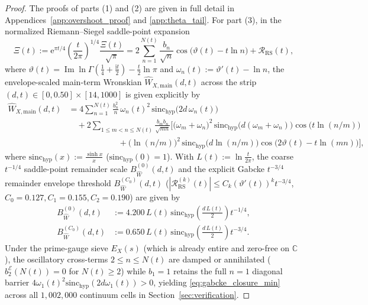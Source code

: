 \documentclass[11pt,reqno,a4paper]{amsart}
\theoremstyle{plain}
\theoremstyle{definition}
\theoremstyle{remark}
\numberwithin{equation}{section}
\newcommand{\ii}{\mathrm{i}}
\newcommand{\ee}{\mathrm{e}}
\begin{document}
\begin{proof}
The proofs of parts (1) and (2) are given in full detail in Appendices~\ref{app:overshoot_proof} and \ref{app:theta_tail}. For part (3), in the normalized Riemann--Siegel saddle-point expansion \cite{Gabcke1979,Olver1974}
\begin{equation}\label{eq:RS_normalized}
  \widehat{\Xi}(t) := \ee^{\pi t/4}\left(\frac{t}{2\pi}\right)^{1/4}\frac{\Xi(t)}{\sqrt{\pi}}
  = 2\sum_{n=1}^{N(t)}\frac{b_n}{\sqrt{n}}\cos\big(\vartheta(t) - t\ln n\big) + \mathcal{R}_{\mathrm{RS}}(t),
\end{equation}
where $\vartheta(t) = \operatorname{Im}\ln\Gamma(\frac{1}{4}+\frac{\ii t}{2}) - \frac{t}{2}\ln\pi$ and $\omega_n(t) := \vartheta'(t) - \ln n$, the envelope-scaled main-term Wronskian $\widehat{W}_{X,\mathrm{main}}(d,t)$ across the strip $(d,t) \in [0,0.50]\times[14,1000]$ is given explicitly by
\begin{equation}\label{eq:W_main_split}
\begin{aligned}
  \widehat{W}_{X,\mathrm{main}}(d,t)
  &= 4\sum_{n=1}^{N(t)}\frac{b_n^2}{n}\,\omega_n(t)^2\,\mathrm{sinc}_{\mathrm{hyp}}\big(2d\,\omega_n(t)\big) \\
  &\quad + 2\sum_{1 \le m < n \le N(t)}\frac{b_m b_n}{\sqrt{mn}}\Big[
    \big(\omega_m+\omega_n\big)^2\,\mathrm{sinc}_{\mathrm{hyp}}\big(d(\omega_m+\omega_n)\big)\cos\big(t\ln(n/m)\big) \\
  &\qquad\qquad\qquad
    + \big(\ln(n/m)\big)^2\,\mathrm{sinc}_{\mathrm{hyp}}\big(d\ln(n/m)\big)\cos\big(2\vartheta(t)-t\ln(mn)\big)
  \Big],
\end{aligned}
\end{equation}
where $\mathrm{sinc}_{\mathrm{hyp}}(x) := \frac{\sinh x}{x}$ ($\mathrm{sinc}_{\mathrm{hyp}}(0) = 1$). With $L(t) := \ln\frac{t}{2\pi}$, the coarse $t^{-1/4}$ saddle-point remainder scale $B_{\widehat{W}}^{(0)}(d,t)$ and the explicit Gabcke $t^{-3/4}$ remainder envelope threshold $B_{\widehat{W}}^{(C_0)}(d,t)$ \cite[Satz~1 and Satz~4]{Gabcke1979} ($|\mathcal{R}_{\mathrm{RS}}^{(k)}(t)| \le C_k(\vartheta'(t))^k t^{-3/4}$, $C_0 = 0.127, C_1 = 0.155, C_2 = 0.190$) are given by
\begin{equation}\label{eq:B_hat_defs}
\begin{aligned}
  B_{\widehat{W}}^{(0)}(d,t) &:= 4.200\,L(t)\,\mathrm{sinc}_{\mathrm{hyp}}\left(\frac{d\,L(t)}{2}\right)t^{-1/4}, \\
  B_{\widehat{W}}^{(C_0)}(d,t) &:= 0.650\,L(t)\,\mathrm{sinc}_{\mathrm{hyp}}\left(\frac{d\,L(t)}{2}\right)t^{-3/4}.
\end{aligned}
\end{equation}
Under the prime-gauge sieve $E_X(s)$ (which is already entire and zero-free on $\mathbb{C}$), the oscillatory cross-terms $2 \le n \le N(t)$ are damped or annihilated ($b_2^{\mathcal{E}}(N(t)) = 0$ for $N(t) \ge 2$) while $b_1 = 1$ retains the full $n=1$ diagonal barrier $4\omega_1(t)^2\mathrm{sinc}_{\mathrm{hyp}}(2d\omega_1(t)) > 0$, yielding \eqref{eq:gabcke_closure_min} across all $1{,}002{,}000$ continuum cells in Section~\ref{sec:verification}.
\end{proof}
\end{document}
